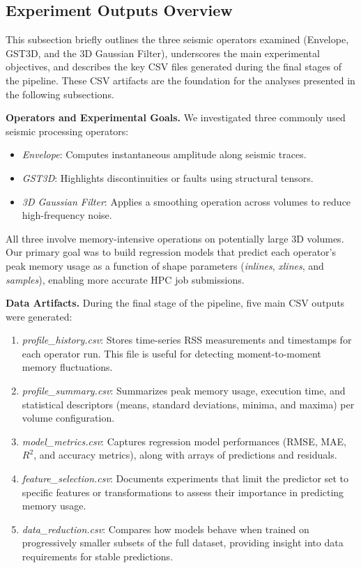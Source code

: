 \subsection{Experiment Outputs Overview}
\label{subsec:pmc-results-experiment-outputs-overview}

This subsection briefly outlines the three seismic operators examined (Envelope, \ac{GST3D}, and the 3D Gaussian Filter), underscores the main experimental objectives, and describes the key \ac{CSV} files generated during the final stages of the pipeline.
These \ac{CSV} artifacts are the foundation for the analyses presented in the following subsections.

\vspace{1em}
\noindent
\textbf{Operators and Experimental Goals.}
We investigated three commonly used seismic processing operators:
\begin{itemize}
    \item \emph{Envelope}: Computes instantaneous amplitude along seismic traces.
    \item \emph{\ac{GST3D}}: Highlights discontinuities or faults using structural tensors.
    \item \emph{3D Gaussian Filter}: Applies a smoothing operation across volumes to reduce high-frequency noise.
\end{itemize}
All three involve memory-intensive operations on potentially large \ac{3D} volumes.
Our primary goal was to build regression models that predict each operator’s peak memory usage as a function of shape parameters (\textit{inlines}, \textit{xlines}, and \textit{samples}), enabling more accurate \ac{HPC} job submissions.

\vspace{1em}
\noindent
\textbf{Data Artifacts.}
During the final stage of the pipeline, five main \ac{CSV} outputs were generated:
\begin{enumerate}
    \item \emph{profile\_history.csv}: Stores time-series \ac{RSS} measurements and timestamps for each operator run. This file is useful for detecting moment-to-moment memory fluctuations.
    \item \emph{profile\_summary.csv}: Summarizes peak memory usage, execution time, and statistical descriptors (means, standard deviations, minima, and maxima) per volume configuration.
    \item \emph{model\_metrics.csv}: Captures regression model performances (\ac{RMSE}, \ac{MAE}, $R^2$, and accuracy metrics), along with arrays of predictions and residuals.
    \item \emph{feature\_selection.csv}: Documents experiments that limit the predictor set to specific features or transformations to assess their importance in predicting memory usage.
    \item \emph{data\_reduction.csv}: Compares how models behave when trained on progressively smaller subsets of the full dataset, providing insight into data requirements for stable predictions.
\end{enumerate}

